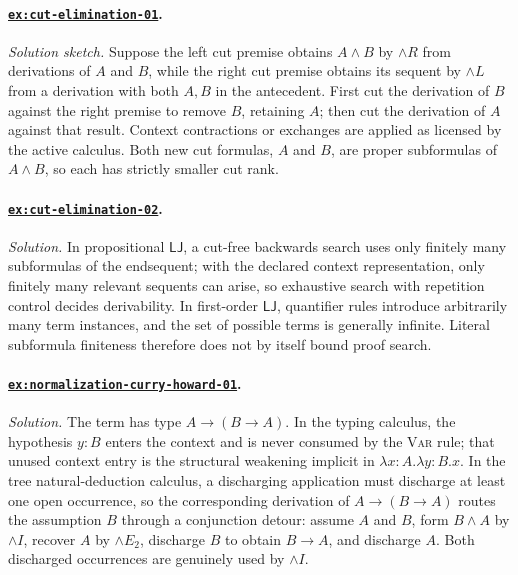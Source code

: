 \documentclass[11pt,oneside,openany]{book}
\theoremstyle{definition}
\theoremstyle{plain}
\theoremstyle{remark}
\newcommand{\LJ}{\mathsf{LJ}}
\begin{document}
\paragraph{\hyperref[ex:cut-elimination-01]{\texttt{ex:cut-elimination-01}}.}
\textit{Solution sketch.}  Suppose the left cut premise obtains
\(A\land B\) by \(\land R\) from derivations of \(A\) and \(B\), while the
right cut premise obtains its sequent by \(\land L\) from a derivation with
both \(A,B\) in the antecedent.  First cut the derivation of \(B\) against the
right premise to remove \(B\), retaining \(A\); then cut the derivation of
\(A\) against that result.  Context contractions or exchanges are applied as
licensed by the active calculus.  Both new cut formulas, \(A\) and \(B\), are
proper subformulas of \(A\land B\), so each has strictly smaller cut rank.

\paragraph{\hyperref[ex:cut-elimination-02]{\texttt{ex:cut-elimination-02}}.}
\textit{Solution.}  In propositional \(\LJ\), a cut-free backwards search uses
only finitely many subformulas of the endsequent; with the declared context
representation, only finitely many relevant sequents can arise, so exhaustive
search with repetition control decides derivability.  In first-order
\(\LJ\), quantifier rules introduce arbitrarily many term instances, and the
set of possible terms is generally infinite.  Literal subformula finiteness
therefore does not by itself bound proof search.

\paragraph{\hyperref[ex:normalization-curry-howard-01]{\texttt{ex:normalization-curry-howard-01}}.}
\textit{Solution.}  The term has type \(A\to(B\to A)\).  In the typing
calculus, the hypothesis \(y:B\) enters the context and is never consumed
by the \textsc{Var} rule; that unused context entry is the structural
weakening implicit in \(\lambda x{:}A.\lambda y{:}B.x\).  In the tree
natural-deduction calculus, a discharging application must discharge at
least one open occurrence, so the corresponding derivation of
\(A\to(B\to A)\) routes the assumption \(B\) through a conjunction
detour: assume \(A\) and \(B\), form \(B\land A\) by \(\land I\), recover
\(A\) by \(\land E_2\), discharge \(B\) to obtain \(B\to A\), and
discharge \(A\).  Both discharged occurrences are genuinely used by
\(\land I\).
\end{document}
